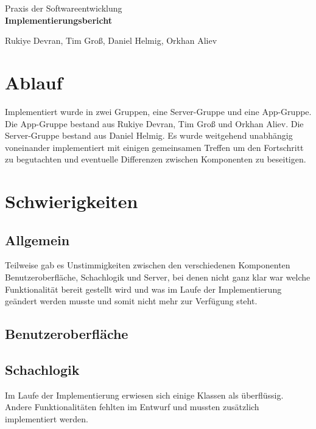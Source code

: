 \documentclass[parskip=full]{scrartcl}
\begin{document}
	\begin{titlepage}
		
		\centering
		\vspace*{0.2\textheight}
		{\Large Praxis der Softwareentwicklung}\\[\baselineskip]
		\vspace{2cm}
		{\Huge \textbf{Implementierungsbericht}}\\[\baselineskip]\par
		\vspace{2cm}
		{\LARGE Rukiye Devran, Tim Groß, Daniel Helmig, Orkhan Aliev}\par		
		\newpage	
		\tableofcontents
		\pagebreak
		
	\end{titlepage}
	\section{Ablauf}
	Implementiert wurde in zwei Gruppen, eine Server-Gruppe und eine App-Gruppe.
	Die App-Gruppe bestand aus Rukiye Devran, Tim Groß und Orkhan Aliev.
	Die Server-Gruppe bestand aus Daniel Helmig.
	Es wurde weitgehend unabhängig voneinander implementiert mit einigen gemeinsamen Treffen um den Fortschritt zu begutachten und eventuelle Differenzen zwischen Komponenten zu beseitigen.
	\section{Schwierigkeiten}
		\subsection{Allgemein} 
		Teilweise gab es Unstimmigkeiten zwischen den verschiedenen Komponenten Benutzeroberfläche, Schachlogik und Server, bei denen nicht ganz klar war welche Funktionalität bereit gestellt wird und was im Laufe der Implementierung geändert werden musste und somit nicht mehr zur Verfügung steht. 
		\subsection{Benutzeroberfläche}		
		\subsection{Schachlogik}
		Im Laufe der Implementierung erwiesen sich einige Klassen als überflüssig. Andere Funktionalitäten fehlten im Entwurf und mussten zusätzlich implementiert werden.
		
\end{document}

